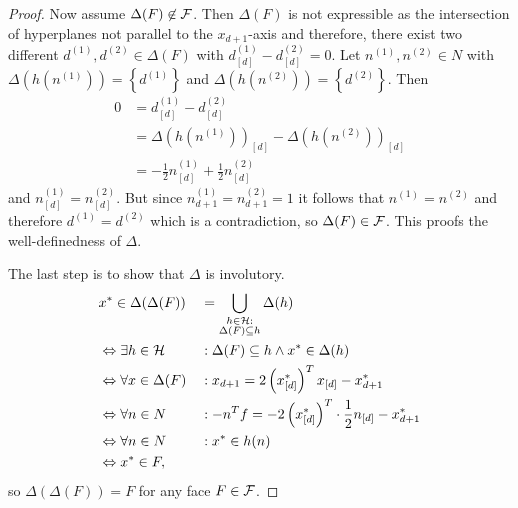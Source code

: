 \begin{proof}
    Now assume $\Delta(F) \not\in \mathcal{F}$.
    Then $\Delta(F)$ is not expressible as the intersection of hyperplanes not parallel to the $x_{d+1}$-axis and therefore, there exist two different $d^{(1)}, d^{(2)} \in \Delta(F)$ with $d_{[d]}^{(1)} - d_{[d]}^{(2)} = 0$.
    Let $n^{(1)}, n^{(2)} \in N$ with $\Delta(h(n^{(1)})) = \left\{ d^{(1)} \right\}$ and $\Delta(h(n^{(2)})) = \left\{ d^{(2)} \right\}$.
    Then
    \begin{align}
        0 &= d_{[d]}^{(1)} - d_{[d]}^{(2)}\\
        &= \Delta(h(n^{(1)}))_{[d]} - \Delta(h(n^{(2)}))_{[d]}\\
        &= -\frac{1}{2} n^{(1)}_{[d]} + \frac{1}{2} n^{(2)}_{[d]}
    \end{align}
    and $n^{(1)}_{[d]} = n^{(2)}_{[d]}$.
    But since $n^{(1)}_{d+1} = n^{(2)}_{d+1} = 1$ it follows that $n^{(1)} = n^{(2)}$ and therefore $d^{(1)} = d^{(2)}$ which is a contradiction, so $\Delta(F) \in \mathcal{F}$.
    This proofs the well-definedness of $\Delta$.

    The last step is to show that $\Delta$ is involutory.
    \begin{alignat}{2}
        &x^\ast \in \Delta(\Delta(F)) &&= \bigcup_{\substack{h \in \mathcal{H}:\\ \Delta(F) \subseteq h}} \Delta(h)\\
        &\Leftrightarrow \exists h \in \mathcal{H} &&{}: \Delta(F) \subseteq h \wedge x^\ast \in \Delta(h)\\
        &\Leftrightarrow \forall x \in \Delta(F) &&{}: x_{d+1} = 2 \left( x_{[d]}^\ast \right)^T x_{[d]} - x_{d+1}^\ast\\
        &\Leftrightarrow \forall n \in N &&{}: -n^Tf = -2 \left( x_{[d]}^\ast \right)^T \cdot \frac{1}{2}n_{[d]} - x_{d+1}^\ast\\
        &\Leftrightarrow \forall n \in N &&{}: x^\ast \in h(n)\\
        &\Leftrightarrow x^\ast \in F,
    \end{alignat}
    so $\Delta(\Delta(F)) = F$ for any face $F \in \mathcal{F}$.
\end{proof}

